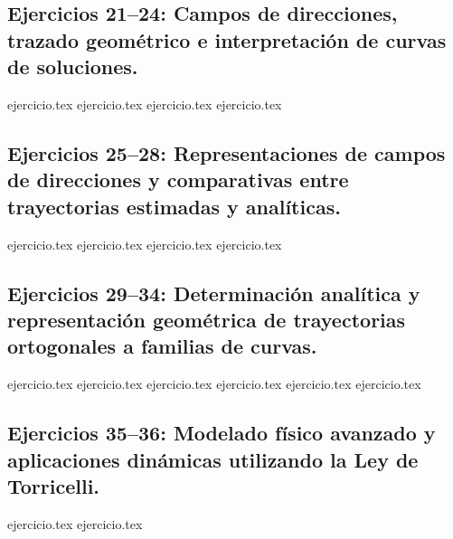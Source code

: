 \subsection*{Ejercicios 21--24: Campos de direcciones, trazado geométrico e interpretación de curvas de soluciones.}
\begin{enumerate}
    \setcounter{enumi}{20}
    {ejercicio.tex}
    {ejercicio.tex}
    {ejercicio.tex}
    {ejercicio.tex}
\end{enumerate}

\subsection*{Ejercicios 25--28: Representaciones de campos de direcciones y comparativas entre trayectorias estimadas y analíticas.}
\begin{enumerate}
    \setcounter{enumi}{24}
    {ejercicio.tex}
    {ejercicio.tex}
    {ejercicio.tex}
    {ejercicio.tex}
\end{enumerate}

\subsection*{Ejercicios 29--34: Determinación analítica y representación geométrica de trayectorias ortogonales a familias de curvas.}
\begin{enumerate}
    \setcounter{enumi}{28}
    {ejercicio.tex}
    {ejercicio.tex}
    {ejercicio.tex}
    {ejercicio.tex}
    {ejercicio.tex}
    {ejercicio.tex}
\end{enumerate}

\subsection*{Ejercicios 35--36: Modelado físico avanzado y aplicaciones dinámicas utilizando la Ley de Torricelli.}
\begin{enumerate}
    \setcounter{enumi}{34}
    {ejercicio.tex}
    {ejercicio.tex}
\end{enumerate}
